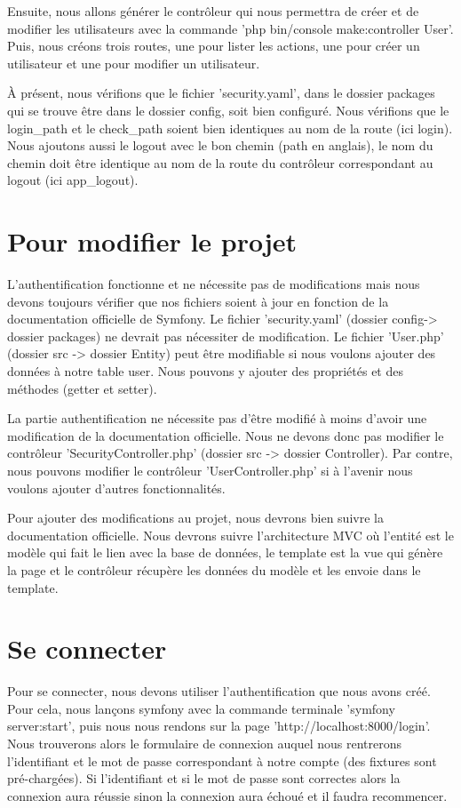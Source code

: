 \documentclass{article}
\theoremstyle{definition}
\theoremstyle{remark}
\begin{document}
Ensuite, nous allons générer le contrôleur qui nous permettra de créer et de modifier les utilisateurs avec la commande 'php bin/console make:controller User'. Puis, nous créons trois routes, une pour lister les actions, une pour créer un utilisateur et une pour modifier un utilisateur.

À présent, nous vérifions que le fichier 'security.yaml', dans le dossier packages qui se trouve être dans le dossier config, soit bien configuré. Nous vérifions que le login_path et le check_path soient bien identiques au nom de la route (ici login). Nous ajoutons aussi le logout avec le bon chemin (path en anglais), le nom du chemin doit être identique au nom de la route du contrôleur correspondant au logout (ici app_logout).

\section{Pour modifier le projet}

L'authentification fonctionne et ne nécessite pas de modifications mais nous devons toujours vérifier que nos fichiers soient à jour en fonction de la documentation officielle de Symfony. Le fichier 'security.yaml' (dossier config-> dossier packages) ne devrait pas nécessiter de modification. Le fichier 'User.php' (dossier src -> dossier Entity) peut être modifiable si nous voulons ajouter des données à notre table user. Nous pouvons y ajouter des propriétés et des méthodes (getter et setter).

La partie authentification ne nécessite pas d'être modifié à moins d'avoir une modification de la documentation officielle. Nous ne devons donc pas modifier le contrôleur 'SecurityController.php' (dossier src -> dossier Controller). Par contre, nous pouvons modifier le contrôleur 'UserController.php' si à l'avenir nous voulons ajouter d'autres fonctionnalités.

Pour ajouter des modifications au projet, nous devrons bien suivre la documentation officielle. Nous devrons suivre l'architecture MVC où l'entité est le modèle qui fait le lien avec la base de données, le template est la vue qui génère la page et le contrôleur récupère les données du modèle et les envoie dans le template.

\section{Se connecter}

Pour se connecter, nous devons utiliser l'authentification que nous avons créé. Pour cela, nous lançons symfony avec la commande terminale 'symfony server:start', puis nous nous rendons sur la page 'http://localhost:8000/login'. Nous trouverons alors le formulaire de connexion auquel nous rentrerons l'identifiant et le mot de passe correspondant à notre compte (des fixtures sont pré-chargées). Si l'identifiant et si le mot de passe sont correctes alors la connexion aura réussie sinon la connexion aura échoué et il faudra recommencer.
\end{document}
